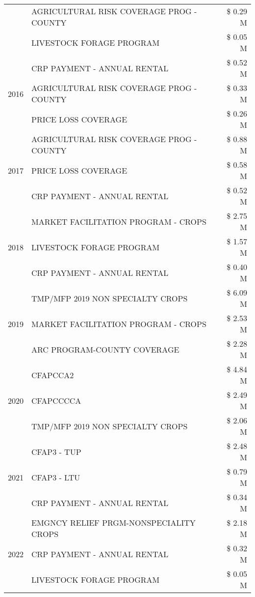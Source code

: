 \begin{tabular}{llr}
 & AGRICULTURAL RISK COVERAGE PROG - COUNTY & \$ 0.29 M \\
 & LIVESTOCK FORAGE PROGRAM & \$ 0.05 M \\
\cline{1-3}
\multirow[t]{3}{*}{2016} & CRP PAYMENT - ANNUAL RENTAL & \$ 0.52 M \\
 & AGRICULTURAL RISK COVERAGE PROG - COUNTY & \$ 0.33 M \\
 & PRICE LOSS COVERAGE & \$ 0.26 M \\
\cline{1-3}
\multirow[t]{3}{*}{2017} & AGRICULTURAL RISK COVERAGE PROG - COUNTY & \$ 0.88 M \\
 & PRICE LOSS COVERAGE & \$ 0.58 M \\
 & CRP PAYMENT - ANNUAL RENTAL & \$ 0.52 M \\
\cline{1-3}
\multirow[t]{3}{*}{2018} & MARKET FACILITATION PROGRAM - CROPS & \$ 2.75 M \\
 & LIVESTOCK FORAGE PROGRAM & \$ 1.57 M \\
 & CRP PAYMENT - ANNUAL RENTAL & \$ 0.40 M \\
\cline{1-3}
\multirow[t]{3}{*}{2019} & TMP/MFP 2019 NON SPECIALTY CROPS & \$ 6.09 M \\
 & MARKET FACILITATION PROGRAM - CROPS & \$ 2.53 M \\
 & ARC PROGRAM-COUNTY COVERAGE & \$ 2.28 M \\
\cline{1-3}
\multirow[t]{3}{*}{2020} & CFAPCCA2 & \$ 4.84 M \\
 & CFAPCCCCA & \$ 2.49 M \\
 & TMP/MFP 2019 NON SPECIALTY CROPS & \$ 2.06 M \\
\cline{1-3}
\multirow[t]{3}{*}{2021} & CFAP3 - TUP & \$ 2.48 M \\
 & CFAP3 - LTU & \$ 0.79 M \\
 & CRP PAYMENT - ANNUAL RENTAL & \$ 0.34 M \\
\cline{1-3}
\multirow[t]{3}{*}{2022} & EMGNCY RELIEF PRGM-NONSPECIALITY CROPS & \$ 2.18 M \\
 & CRP PAYMENT - ANNUAL RENTAL & \$ 0.32 M \\
 & LIVESTOCK FORAGE PROGRAM & \$ 0.05 M \\
\cline{1-3}
\bottomrule
\end{tabular}
